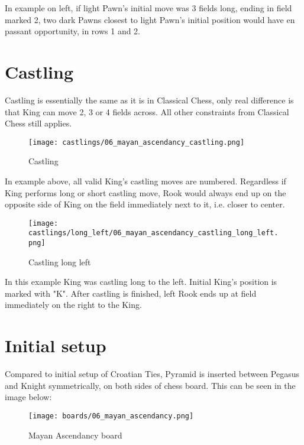 In example on left, if light Pawn's initial move was 3 fields long, ending in field marked
2, two dark Pawns closest to light Pawn's initial position would have en passant opportunity,
in rows 1 and 2.

\clearpage %

\section*{Castling}

Castling is essentially the same as it is in Classical Chess, only real difference is that
King can move 2, 3 or 4 fields across. All other constraints from Classical Chess still
applies.

\noindent
\begin{figure}[!h]
\texttt{[image: castlings/06\_mayan\_ascendancy\_castling.png]}
\caption{Castling}
\label{fig:06_mayan_ascendancy_castling}
\end{figure}

In example above, all valid King's castling moves are numbered. Regardless if King performs
long or short castling move, Rook would always end up on the opposite side of King on the
field immediately next to it, i.e. closer to center.

\noindent
\begin{figure}[!h]
\texttt{[image: castlings/long\_left/06\_mayan\_ascendancy\_castling\_long\_left.png]}
\caption{Castling long left}
\label{fig:06_mayan_ascendancy_castling_long_left}
\end{figure}

In this example King was castling long to the left. Initial King's position is marked with "K".
After castling is finished, left Rook ends up at field immediately on the right to the King.

\clearpage %

\section*{Initial setup}

Compared to initial setup of Croatian Ties, Pyramid is inserted between Pegasus and Knight
symmetrically, on both sides of chess board. This can be seen in the image below:

\noindent
\begin{figure}[h]
\texttt{[image: boards/06\_mayan\_ascendancy.png]}
\caption{Mayan Ascendancy board}
\label{fig:06_mayan_ascendancy}
\end{figure}

\clearpage %
